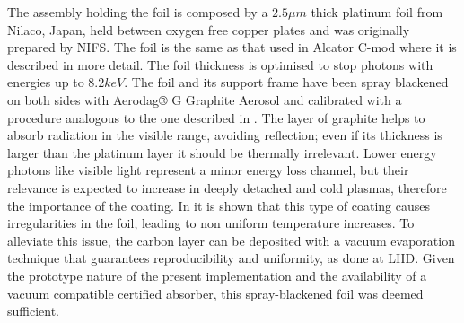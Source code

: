 The assembly holding the foil is composed by a $2.5\mu m$ thick platinum foil from Nilaco, Japan, held between oxygen free copper plates and was originally prepared by NIFS. The foil is the same as that used in Alcator C-mod\cite{Reinke2018a} where it is described in more detail. The foil thickness is optimised to stop photons with energies up to $8.2keV$. \cite{PETERSON2010,Gullikson2022} The foil and its support frame have been spray blackened on both sides with Aerodag® G Graphite Aerosol and calibrated with a procedure analogous to the one described in \cite{Itomi2014}. The layer of graphite helps to absorb radiation in the visible range, avoiding reflection; even if its thickness is larger than the platinum layer\cite{Pandya2014} it should be thermally irrelevant. \cite{VanEden2018} Lower energy photons like visible light represent a minor energy loss channel, but their relevance is expected to increase in deeply detached and cold plasmas, therefore the importance of the coating.\cite{Havlickova2015a} In \cite{Mukai2016} it is shown that this type of coating causes irregularities in the foil, leading to non uniform temperature increases. To alleviate this issue, the carbon layer can be deposited with a vacuum evaporation technique that guarantees reproducibility and uniformity, as done at LHD. \cite{Mukai2016} Given the prototype nature of the present implementation and the availability of a vacuum compatible certified absorber, this spray-blackened foil was deemed sufficient.

